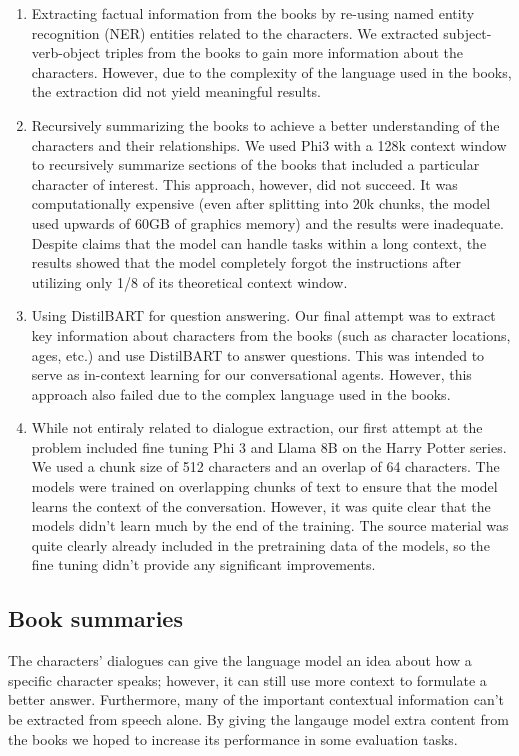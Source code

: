 \documentclass[fleqn,moreauthors,10pt]{ds_report}
\begin{document}
\begin{enumerate}
	\item Extracting factual information from the books by re-using named entity recognition (NER) entities related to the characters. We extracted subject-verb-object triples from the books to gain more information about the characters. However, due to the complexity of the language used in the books, the extraction did not yield meaningful results.

	\item  {} Recursively summarizing the books to achieve a better understanding of the characters and their relationships. We used Phi3 with a 128k context window to recursively summarize sections of the books that included a particular character of interest. This approach, however, did not succeed. It was computationally expensive (even after splitting into 20k chunks, the model used upwards of 60GB of graphics memory) and the results were inadequate. Despite claims that the model can handle tasks within a long context, the results showed that the model completely forgot the instructions after utilizing only 1/8 of its theoretical context window.

	\item Using DistilBART for question answering. Our final attempt was to extract key information about characters from the books (such as character locations, ages, etc.) and use DistilBART to answer questions. This was intended to serve as in-context learning for our conversational agents. However, this approach also failed due to the complex language used in the books.
	\item While not entiraly related to dialogue extraction, our first attempt at the problem included fine tuning Phi 3 and Llama 8B on the Harry Potter series. We used a chunk size of 512 characters and an overlap of 64 characters. The models were trained on overlapping chunks of text to ensure that the model learns the context of the conversation. However, it was quite clear that the models didn't learn much by the end of the training. The source material was quite clearly already included in the pretraining data of the models, so the fine tuning didn't provide any significant improvements.

\end{enumerate}

\subsection*{Book summaries}
The characters' dialogues can give the language model an idea about how a specific character speaks; however, it can still use more context to formulate a better answer.
Furthermore, many of the important contextual information can't be extracted from speech alone.
By giving the langauge model extra content from the books we hoped to increase its performance in some evaluation tasks.
\end{document}
